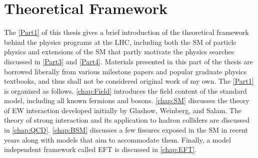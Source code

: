 \part{Theoretical Framework}
\label{Part1}
The \autoref{Part1} of this thesis gives a brief introduction of the theoretical framework behind the physics programs at the \ac{LHC}, including both the \ac{SM} of particle physics and extensions of the \ac{SM} that partly motivate the physics searches discussed in \autoref{Part3} and \autoref{Part4}. Materials presented in this part of the thesis are borrowed liberally from various milestone papers and popular graduate physics textbooks, and thus shall not be considered original work of my own. The \autoref{Part1} is organized as follows. \autoref{chap:Field} introduces the field content of the standard model, including all known fermions and bosons. \autoref{chap:SM} discusses the theory of \ac{EW} interaction developed initially by Glashow, Weinberg, and Salam. The theory of strong interaction and its application to hadron colliders are discussed in \autoref{chap:QCD}. \autoref{chap:BSM} discusses a few fissures exposed in the \ac{SM} in recent years along with models that aim to accommodate them. Finally, a model independent framework called \ac{EFT} is discussed in \autoref{chap:EFT}.







